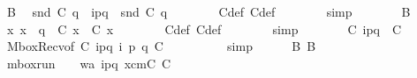 \begin{isabellebody}
\ B{}{}\ \isamarkupfalse%
\ {\isachardoublequoteopen}snd\ {\isacharparenleft}{\kern0pt}C{}\ q{\isacharparenright}{\kern0pt}\ {\isacharequal}{\kern0pt}\ {\isacharbrackleft}{\kern0pt}i\isactrlbsup p{\isasymrightarrow}q\isactrlesup {\isacharbrackright}{\kern0pt}\ {\isasymcdot}\ snd\ {\isacharparenleft}{\kern0pt}C{}\ q{\isacharparenright}{\kern0pt}{\isachardoublequoteclose}\isanewline
\ \ \ \ \ \ \isamarkupfalse%
\ C{}{\isacharunderscore}{\kern0pt}def\ C{}{\isacharunderscore}{\kern0pt}def\isanewline
\ \ \ \ \ \ \isamarkupfalse%
\ simp\isanewline
\ \ \ \ \isamarkupfalse%
\ \isamarkupfalse%
\ B{}{}\ \isamarkupfalse%
\ {\isachardoublequoteopen}{\isasymforall}x{\isachardot}{\kern0pt}\ x\ {\isasymnoteq}\ q\ {\isasymlongrightarrow}\ C{}\ x\ {\isacharequal}{\kern0pt}\ C{}\ x{\isachardoublequoteclose}\isanewline
\ \ \ \ \ \ \isamarkupfalse%
\ C{}{\isacharunderscore}{\kern0pt}def\ C{}{\isacharunderscore}{\kern0pt}def\isanewline
\ \ \ \ \ \ \isamarkupfalse%
\ simp\isanewline
\ \ \ \ \isamarkupfalse%
\ \isamarkupfalse%
\ {\isachardoublequoteopen}C{}\ {\isasymmidarrow}{\isasymlangle}{\isacharquery}{\kern0pt}{\isasymlangle}{\isacharparenleft}{\kern0pt}i\isactrlbsup p{\isasymrightarrow}q\isactrlesup {\isacharparenright}{\kern0pt}{\isasymrangle}{\isacharcomma}{\kern0pt}\ {}{\isasymrangle}{\isasymrightarrow}\ C{}{\isachardoublequoteclose}\isanewline
\ \ \ \ \ \ \isamarkupfalse%
\ MboxRecv{\isacharbrackleft}{\kern0pt}of\ C{}\ {\isachardoublequoteopen}{\isacharquery}{\kern0pt}{\isasymlangle}{\isacharparenleft}{\kern0pt}i\isactrlbsup p{\isasymrightarrow}q\isactrlesup {\isacharparenright}{\kern0pt}{\isasymrangle}{\isachardoublequoteclose}\ i\ p\ q\ C{}\ {\isachardoublequoteopen}{\isasymB}\ {}{\isachardoublequoteclose}{\isacharbrackright}{\kern0pt}\isanewline
\ \ \ \ \ \ \isamarkupfalse%
\ simp\isanewline
\ \ \ \ \isamarkupfalse%
\ B{}\ B{}{}\ \isamarkupfalse%
\ {\isachardoublequoteopen}mbox{\isacharunderscore}{\kern0pt}run\ {\isasymC}\isactrlsub {\isasymI}\isactrlsub {\isasymmm}\ {\isacharparenleft}{\kern0pt}{\isasymB}\ {}{\isacharparenright}{\kern0pt}\ {\isacharparenleft}{\kern0pt}w{\isasymcdot}{\isacharbrackleft}{\kern0pt}a{\isacharcomma}{\kern0pt}\ {\isacharquery}{\kern0pt}{\isasymlangle}{\isacharparenleft}{\kern0pt}i\isactrlbsup p{\isasymrightarrow}q\isactrlesup {\isacharparenright}{\kern0pt}{\isasymrangle}{\isacharbrackright}{\kern0pt}{\isacharparenright}{\kern0pt}\ {\isacharparenleft}{\kern0pt}xcm{\isasymcdot}{\isacharbrackleft}{\kern0pt}C{}{\isacharcomma}{\kern0pt}\ C{}{\isacharbrackright}{\kern0pt}{\isacharparenright}{\kern0pt}{\isachardoublequoteclose}\isanewline

\end{isabellebody}
